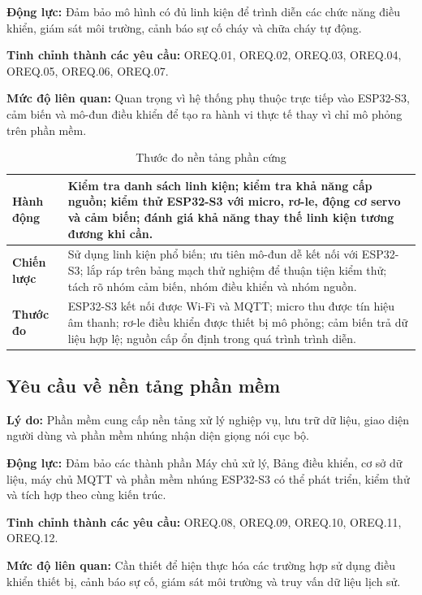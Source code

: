 \documentclass[a4paper,12pt]{article}
\begin{document}
\textbf{Động lực:} Đảm bảo mô hình có đủ linh kiện để trình diễn các chức năng điều khiển, giám sát môi trường, cảnh báo sự cố cháy và chữa cháy tự động.

\textbf{Tinh chỉnh thành các yêu cầu:} OREQ.01, OREQ.02, OREQ.03, OREQ.04, OREQ.05, OREQ.06, OREQ.07.

\textbf{Mức độ liên quan:} Quan trọng vì hệ thống phụ thuộc trực tiếp vào ESP32-S3, cảm biến và mô-đun điều khiển để tạo ra hành vi thực tế thay vì chỉ mô phỏng trên phần mềm.

\begin{table}[H]
\centering
\caption{Thước đo nền tảng phần cứng}
\small
\begin{tabularx}{\linewidth}{|p{3cm}|X|}
\hline
\textbf{Hành động} & Kiểm tra danh sách linh kiện; kiểm tra khả năng cấp nguồn; kiểm thử ESP32-S3 với micro, rơ-le, động cơ servo và cảm biến; đánh giá khả năng thay thế linh kiện tương đương khi cần. \\
\hline
\textbf{Chiến lược} & Sử dụng linh kiện phổ biến; ưu tiên mô-đun dễ kết nối với ESP32-S3; lắp ráp trên bảng mạch thử nghiệm để thuận tiện kiểm thử; tách rõ nhóm cảm biến, nhóm điều khiển và nhóm nguồn. \\
\hline
\textbf{Thước đo} & ESP32-S3 kết nối được Wi-Fi và MQTT; micro thu được tín hiệu âm thanh; rơ-le điều khiển được thiết bị mô phỏng; cảm biến trả dữ liệu hợp lệ; nguồn cấp ổn định trong quá trình trình diễn. \\
\hline
\end{tabularx}
\end{table}

\subsection{Yêu cầu về nền tảng phần mềm}

\textbf{Lý do:} Phần mềm cung cấp nền tảng xử lý nghiệp vụ, lưu trữ dữ liệu, giao diện người dùng và phần mềm nhúng nhận diện giọng nói cục bộ.

\textbf{Động lực:} Đảm bảo các thành phần Máy chủ xử lý, Bảng điều khiển, cơ sở dữ liệu, máy chủ MQTT và phần mềm nhúng ESP32-S3 có thể phát triển, kiểm thử và tích hợp theo cùng kiến trúc.

\textbf{Tinh chỉnh thành các yêu cầu:} OREQ.08, OREQ.09, OREQ.10, OREQ.11, OREQ.12.

\textbf{Mức độ liên quan:} Cần thiết để hiện thực hóa các trường hợp sử dụng điều khiển thiết bị, cảnh báo sự cố, giám sát môi trường và truy vấn dữ liệu lịch sử.
\end{document}
